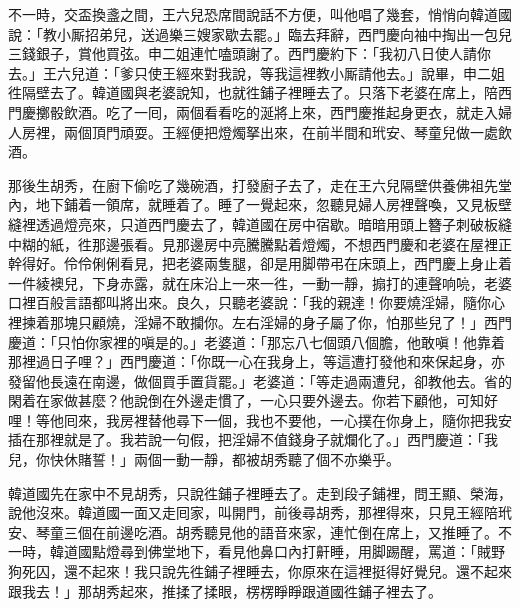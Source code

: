 不一時，交盃換盞之間，王六兒恐席間說話不方便，{}叫他唱了幾套，悄悄向韓道國說：「教小厮招弟兒，送過樂三嫂家歇去罷。」臨去拜辭，西門慶向袖中掏出一包兒三錢銀子，賞他買弦。申二姐連忙嗑頭謝了。西門慶約下：「我初八日使人請你去。」王六兒道：「爹只使王經來對我說，等我這裡教小厮請他去。」說畢，申二姐徃隔壁去了。韓道國與老婆說知，也就徃鋪子裡睡去了。{}只落下老婆在席上，陪西門慶擲骰飲酒。吃了一囘，兩個看看吃的涎將上來，西門慶推起身更衣，就走入婦人房裡，兩個頂門頑耍。王經便把燈燭拏出來，在前半間和玳安、琴童兒做一處飲酒。

那後生胡秀，在廚下偷吃了幾碗酒，{}打發廚子去了，走在王六兒隔壁供養佛祖先堂內，地下鋪着一領席，就睡着了。睡了一覺起來，忽聽見婦人房裡聲喚，又見板壁縫裡透過燈亮來，只道西門慶去了，韓道國在房中宿歇。暗暗用頭上簪子刺破板縫中糊的紙，徃那邊張看。見那邊房中亮騰騰點着燈燭，不想西門慶和老婆在屋裡正幹得好。{}伶伶俐俐看見，把老婆兩隻腿，卻是用脚帶弔在床頭上，西門慶上身止着一件綾襖兒，下身赤露，就在床沿上一來一徃，一動一靜，搧打的連聲响喨，老婆口裡百般言語都叫將出來。良久，只聽老婆說：「我的親達！你要燒淫婦，隨你心裡揀着那塊只顧燒，淫婦不敢攔你。左右淫婦的身子屬了你，怕那些兒了！」西門慶道：「只怕你家裡的嗔是的。」{}老婆道：「那忘八七個頭八個膽，他敢嗔！他靠着那裡過日子哩？」西門慶道：「你既一心在我身上，等這遭打發他和來保起身，亦發留他長遠在南邊，做個買手置貨罷。」{}老婆道：「等走過兩遭兒，卻教他去。省的閑着在家做甚麼？他說倒在外邊走慣了，一心只要外邊去。你若下顧他，可知好哩！等他囘來，我房裡替他尋下一個，我也不要他，一心撲在你身上，隨你把我安插在那裡就是了。我若說一句假，把淫婦不值錢身子就爛化了。」{}西門慶道：「我兒，你快休賭誓！」兩個一動一靜，都被胡秀聽了個不亦樂乎。

韓道國先在家中不見胡秀，只說徃鋪子裡睡去了。走到段子鋪裡，問王顯、榮海，說他沒來。韓道國一面又走囘家，叫開門，前後尋胡秀，那裡得來，只見王經陪玳安、琴童三個在前邊吃酒。胡秀聽見他的語音來家，連忙倒在席上，又推睡了。不一時，韓道國點燈尋到佛堂地下，看見他鼻口內打鼾睡，用脚踢醒，罵道：「賊野狗死囚，還不起來！我只說先徃鋪子裡睡去，你原來在這裡挺得好覺兒。還不起來跟我去！」那胡秀起來，推揉了揉眼，楞楞睜睜跟道國徃鋪子裡去了。

